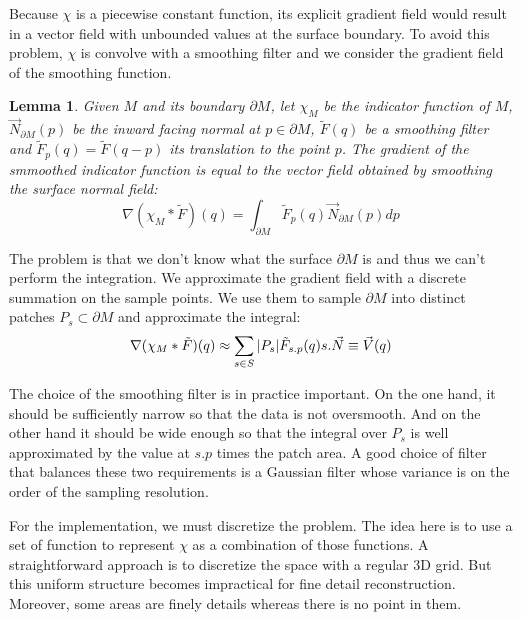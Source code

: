 \documentclass[12pt]{article}
\begin{document}
Because $\chi$ is a piecewise constant function, its explicit gradient field would result in a vector field with unbounded values at the surface boundary. To avoid this problem, $\chi$ is convolve with a smoothing filter and we consider the gradient field of the smoothing function.

\newtheorem{lemma}{Lemma}
\begin{lemma}
Given $M$ and its boundary $\partial M$, let $\chi_M$ be the indicator function of $M$, $\vec{N}_{\partial M}(p)$ be the inward facing normal at $p \in \partial M$, $\tilde{F}(q)$ be a smoothing filter and $\tilde{F}_p(q) = \tilde{F}(q-p)$ its translation to the point $p$. The gradient of the smmoothed indicator function is equal to the vector field obtained by smoothing the surface normal field:
$$\nabla(\chi_M * \tilde{F})(q) = \int_{\partial M} \tilde{F}_p(q) \vec{N}_{\partial M}(p) dp$$
\end{lemma}

The problem is that we don't know what the surface $\partial M$ is and thus we can't perform the integration. We approximate the gradient field with a discrete summation on the sample points. We use them to sample $\partial M$ into distinct patches $P_s \subset \partial M$ and approximate the integral:
\begin{equation}
\nabla(\chi_M * \tilde{F})(q) \approx \sum_{s \in S} \\|P_s\\| \tilde{F}_{s.p}(q) s.\vec{N} \equiv \vec{V}(q)
\label{eq}
\end{equation}

The choice of the smoothing filter is in practice important. On the one hand, it should be sufficiently narrow so that the data is not oversmooth. And on the other hand it should be wide enough so that the integral over $P_s$ is well approximated by the value at $s.p$ times the patch area. A good choice of filter that balances these two requirements is a Gaussian filter whose variance is on the order of the sampling resolution.

For the implementation, we must discretize the problem. The idea here is to use a set of function to represent $\chi$ as a combination of those functions. A straightforward approach is to discretize the space with a regular 3D grid. But this uniform structure becomes impractical for fine detail reconstruction. Moreover, some areas are finely details whereas there is no point in them.
\end{document}

